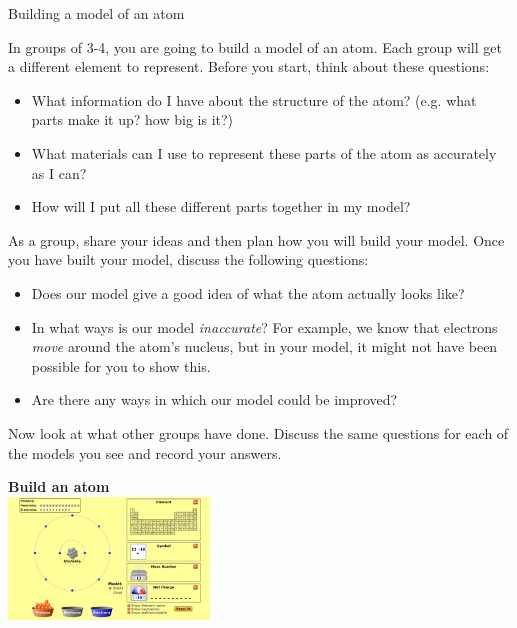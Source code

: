 \begin{groupdiscussion}{Building a model of an atom }
            \nopagebreak
\begin{multicols}{2}
        \label{m38741*id260488}In groups of 3-4, you are going to build a model of an atom. Each group will get a different element to represent. Before you start, think about these questions: 
        \label{m38741*id260495}\begin{itemize}[noitemsep]
            \label{m38741*uid114}\item What information do I have about the structure of the atom? (e.g.\@{} what parts make it up? how big is it?)
\label{m38741*uid115}\item What materials can I use to represent these parts of the atom as accurately as I can?
\label{m38741*uid116}\item How will I put all these different parts together in my model?
\end{itemize}
        \label{m38741*id260537}As a group, share your ideas and then plan how you will build your model. Once you have built your model, discuss the following questions: 
        \label{m38741*id260542}\begin{itemize}[noitemsep]
            \label{m38741*uid117}\item Does our model give a good idea of what the atom actually looks like?
\label{m38741*uid118}\item In what ways is our model \textsl{inaccurate}? For example, we know that electrons \textsl{move} around the atom's nucleus, but in your model, it might not have been possible for you to show this.
\label{m38741*uid119}\item Are there any ways in which our model could be improved?
\end{itemize}
        \label{m38741*id260596}Now look at what other groups have done. Discuss the same questions for each of the models you see and record your answers. 
\end{multicols}
\begin{center}
\textbf{Build an atom}\\
 \includegraphics[width=0.4\textwidth]{photos/BuildAtom.png}
\end{center}

\end{groupdiscussion}   

